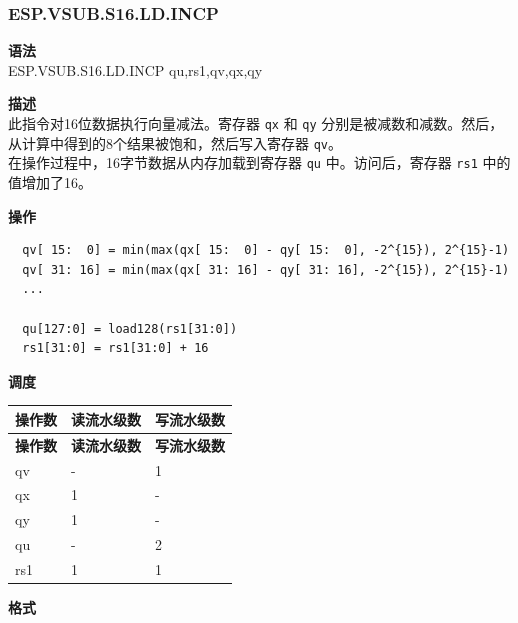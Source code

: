 \newpage
\subsubsection{ESP.VSUB.S16.LD.INCP}\label{instruction:ESPVSUBS16LDINCP}
\textbf{语法}\\
ESP.VSUB.S16.LD.INCP qu,rs1,qv,qx,qy

\textbf{描述}\\
此指令对16位数据执行向量减法。寄存器 \lstinline{qx} 和 \lstinline{qy} 分别是被减数和减数。然后，从计算中得到的8个结果被饱和，然后写入寄存器 \lstinline{qv}。\\ 在操作过程中，16字节数据从内存加载到寄存器 \lstinline{qu} 中。访问后，寄存器 \lstinline{rs1} 中的值增加了16。

\textbf{操作}\\
\begin{lstlisting}
  qv[ 15:  0] = min(max(qx[ 15:  0] - qy[ 15:  0], -2^{15}), 2^{15}-1)
  qv[ 31: 16] = min(max(qx[ 31: 16] - qy[ 31: 16], -2^{15}), 2^{15}-1)
  ...

  qu[127:0] = load128(rs1[31:0])
  rs1[31:0] = rs1[31:0] + 16
\end{lstlisting}


\textbf{调度}\\
\begin{longtable}[c]{|l|l|l|}
    \hline
    \rowcolor{lightgray}
    \textbf{操作数} & \textbf{读流水级数} & \textbf{写流水级数} \\\hline
    \endfirsthead
    \hline
    \rowcolor{lightgray}
     \textbf{操作数} & \textbf{读流水级数} & \textbf{写流水级数} \\\hline
    \endhead
    \hline
    \endfoot

  qv & - & 1 \\\hline
    qx & 1 & - \\\hline
    qy & 1 & - \\\hline
    qu & - & 2 \\\hline
    rs1 & 1 & 1

\end{longtable}

\textbf{格式}\\

